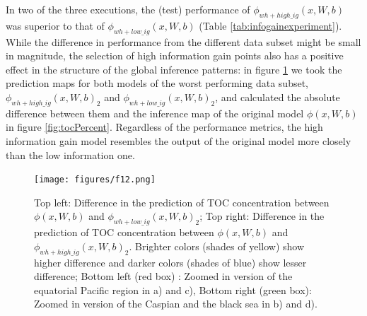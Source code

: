 \documentclass[journal abbreviation, manuscript]{copernicus}
\begin{document}
In two of the three executions, the (test) performance of $\phi_{wh+high\_ig} (x, W, b)$ was superior to that of $\phi_{wh+low\_ig} (x, W, b)$ (Table \ref{tab:infogainexperiment}).
While the difference in performance from the different data subset might be small in magnitude, the selection of high information gain points also has a positive effect in the structure of the global inference patterns: in figure \ref{fig:infogaindiff} we took the prediction maps for both models of the worst performing data subset, $\phi_{wh+high\_ig} (x, W, b)_2$ and $\phi_{wh+low\_ig} (x, W, b)_2$, and calculated the absolute difference between them and the inference map of the original model $\phi (x, W, b)$ in figure \ref{fig:tocPercent}. Regardless of the performance metrics, the high information gain model resembles the  output of the original model more closely than the low information one.


\begin{figure}[!htb]
    \centering
    \texttt{[image: figures/f12.png]}
    \caption{Top left: Difference in the prediction of TOC concentration between $\phi (x, W, b)$ and $\phi_{wh+low\_ig} (x, W, b)_2$; Top right: Difference in the prediction of TOC concentration between $\phi (x, W, b)$ and $\phi_{wh+high\_ig} (x, W, b)_2$. Brighter colors (shades of yellow) show higher difference and darker colors (shades of blue) show lesser difference; Bottom left (red box) : Zoomed in version of the equatorial Pacific region in a) and c), Bottom right (green box): Zoomed in version of the Caspian and the black sea in b) and d).}
    \label{fig:infogaindiff}
\end{figure}
\end{document}
